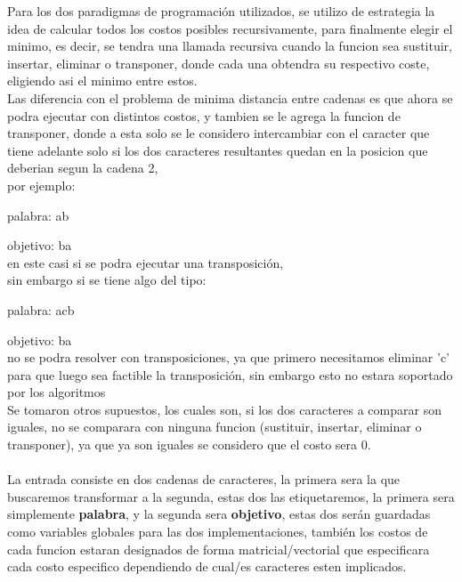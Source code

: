 Para los dos paradigmas de programación utilizados, se utilizo de estrategia la idea de calcular todos los costos posibles recursivamente, para finalmente elegir el minimo, es decir, se tendra una llamada recursiva cuando la funcion sea sustituir, insertar, eliminar o transponer, donde cada una obtendra su respectivo coste, eligiendo asi el minimo entre estos.\\
Las diferencia con el problema de minima distancia entre cadenas es que ahora se podra ejecutar con distintos costos, y tambien se le agrega la funcion de transponer, donde a esta solo se le considero intercambiar con el caracter que tiene adelante solo si los dos caracteres resultantes quedan en la posicion que deberian segun la cadena 2, \\por ejemplo:

palabra: ab

objetivo: ba\\ 
en este casi si se podra ejecutar una transposición, \\sin embargo si se tiene algo del tipo:

palabra: acb

objetivo: ba\\ 
no se podra resolver con transposiciones, ya que primero necesitamos eliminar 'c' para que luego sea factible la transposición, sin embargo esto no estara soportado por los algoritmos\\
Se tomaron otros supuestos, los cuales son, si los dos caracteres a comparar son iguales, no se comparara con ninguna funcion (sustituir, insertar, eliminar o transponer), ya que ya son iguales se considero que el costo sera 0.
\\ \\
La entrada consiste en dos cadenas de caracteres, la primera sera la que buscaremos transformar a la segunda, estas dos las etiquetaremos, la primera sera simplemente \textbf{palabra}, y la segunda sera \textbf{objetivo}, estas dos serán guardadas como variables globales para las dos implementaciones, también los costos de cada funcion estaran designados de forma matricial/vectorial que especificara cada costo especifico dependiendo de cual/es caracteres esten implicados.



